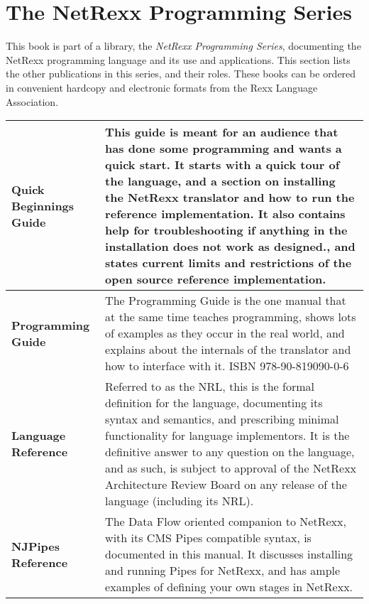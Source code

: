\chapter{The NetRexx Programming Series}
This book is part of a library, the \emph{NetRexx Programming Series}, documenting the NetRexx programming language and its use and applications. This section lists the other publications in this series, and their roles. These books can be ordered in convenient hardcopy and electronic formats from the Rexx Language Association.
\newline
\newline
\newline
\begin{tabularx}{\textwidth}{>{\bfseries}lX}
\toprule
Quick Beginnings Guide & This guide is meant for an audience that has done some programming and wants a quick start. It starts with a quick tour of the language, and a section on installing the NetRexx translator and how to run the reference implementation. It also contains help for troubleshooting if anything in the installation does not work as designed., and states current limits and restrictions of the open source reference implementation.
\\\midrule
Programming Guide & The Programming Guide is the one manual that at the same time teaches programming, shows lots of examples as they occur in the real world, and explains about the internals of the translator and how to interface with it. ISBN 978-90-819090-0-6
\\\midrule
Language Reference & Referred to as the NRL, this is the formal definition for the language, documenting its syntax and semantics, and prescribing minimal functionality for language implementors. It is the definitive answer to any question on the language, and as such, is subject to approval of the NetRexx Architecture Review Board on any release of the language (including its NRL).
\\\midrule
NJPipes Reference & The Data Flow oriented companion to NetRexx, with its CMS Pipes compatible syntax, is documented in this manual. It discusses installing and running Pipes for NetRexx, and has ample examples of defining your own stages in NetRexx.
\\\bottomrule
\end{tabularx}
